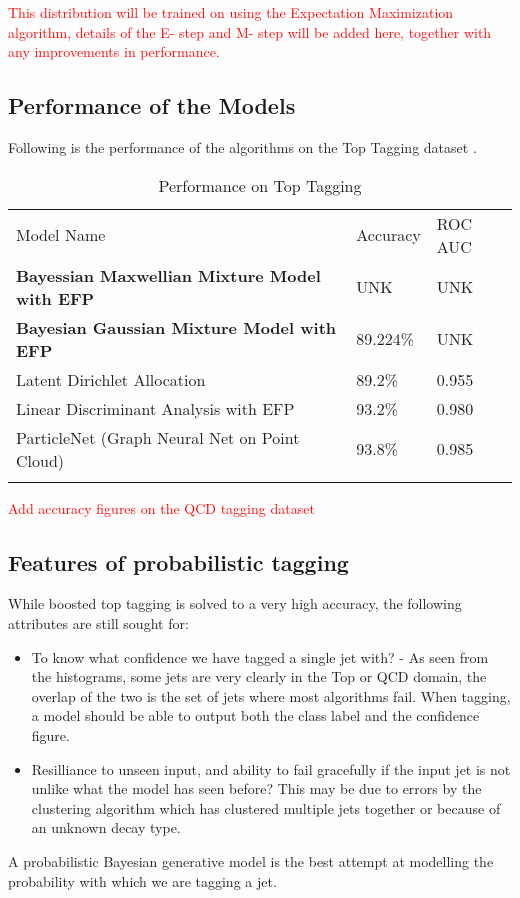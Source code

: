 \textcolor{red}{This distribution will be trained on using the Expectation Maximization algorithm, details of the E- step and M- step will be added here, together with any improvements in performance. ~\cite{maxwellian_plasma}}


\subsection{Performance of the Models}

Following is the performance of the algorithms on the Top Tagging dataset \cite{data_toptagging}.
\begin{table}
    \caption{Performance on Top Tagging \cite{tagging_review}}
    \label{tab:1}
    \begin{tabular}{lll}
        \hline\noalign{\smallskip}
        Model Name                                           & Accuracy & ROC AUC \\
        \noalign{\smallskip}\hline\noalign{\smallskip}
        \textbf{Bayessian Maxwellian Mixture Model with EFP} & UNK      & UNK     \\
        \textbf{Bayesian Gaussian Mixture Model with EFP}    & 89.224\% & UNK     \\
        Latent Dirichlet Allocation                          & 89.2\%   & 0.955   \\
        \noalign{\smallskip}\hline
        Linear Discriminant Analysis with EFP                & 93.2\%   & 0.980   \\
        ParticleNet (Graph Neural Net on Point Cloud)        & 93.8\%   & 0.985   \\
        \noalign{\smallskip}\hline
    \end{tabular}
\end{table}

\textcolor{red}{Add accuracy figures on the QCD tagging dataset \cite{data_qcdtagging}}

\subsection{Features of probabilistic tagging}

While boosted top tagging is solved to a very high accuracy, the following attributes are still sought for:
\begin{itemize}
    \item To know what confidence we have tagged a single jet with? - As seen from the histograms, some jets are very clearly in the Top or QCD domain, the overlap of the two is the set of jets where most algorithms fail. When tagging, a model should be able to output both the class label and the confidence figure.
    \item Resilliance to unseen input, and ability to fail gracefully if the input jet is not unlike what the model has seen before? This may be due to errors by the clustering algorithm which has clustered multiple jets together or because of an unknown decay type.
\end{itemize}
A probabilistic Bayesian generative model is the best attempt at modelling the probability with which we are tagging a jet.

